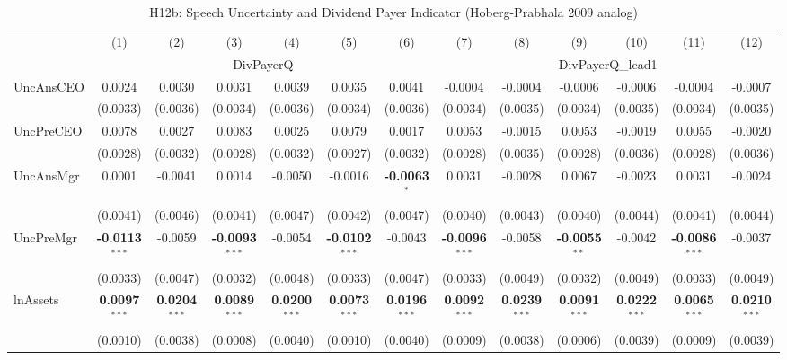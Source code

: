 \begin{landscape}
\begin{table}[H]
\setlength{\tabcolsep}{3pt}
\renewcommand{\arraystretch}{0.85}
\centering
\caption{H12b: Speech Uncertainty and Dividend Payer Indicator (Hoberg-Prabhala 2009 analog)}
\label{tab:h12b}
\scriptsize
\begin{tabular}{lcccccccccccc}
\toprule
 & (1) & (2) & (3) & (4) & (5) & (6) & (7) & (8) & (9) & (10) & (11) & (12) \\
 & \multicolumn{6}{c}{DivPayerQ} & \multicolumn{6}{c}{DivPayerQ\_lead1} \\
\cmidrule(lr){2-7} \cmidrule(lr){8-13}
\midrule
UncAnsCEO & 0.0024 & 0.0030 & 0.0031 & 0.0039 & 0.0035 & 0.0041 & -0.0004 & -0.0004 & -0.0006 & -0.0006 & -0.0004 & -0.0007 \\
 & (0.0033) & (0.0036) & (0.0034) & (0.0036) & (0.0034) & (0.0036) & (0.0034) & (0.0035) & (0.0034) & (0.0035) & (0.0034) & (0.0035) \\
UncPreCEO & 0.0078 & 0.0027 & 0.0083 & 0.0025 & 0.0079 & 0.0017 & 0.0053 & -0.0015 & 0.0053 & -0.0019 & 0.0055 & -0.0020 \\
 & (0.0028) & (0.0032) & (0.0028) & (0.0032) & (0.0027) & (0.0032) & (0.0028) & (0.0035) & (0.0028) & (0.0036) & (0.0028) & (0.0036) \\
UncAnsMgr & 0.0001 & -0.0041 & 0.0014 & -0.0050 & -0.0016 & \textbf{-0.0063}$^{*}$ & 0.0031 & -0.0028 & 0.0067 & -0.0023 & 0.0031 & -0.0024 \\
 & (0.0041) & (0.0046) & (0.0041) & (0.0047) & (0.0042) & (0.0047) & (0.0040) & (0.0043) & (0.0040) & (0.0044) & (0.0041) & (0.0044) \\
UncPreMgr & \textbf{-0.0113}$^{***}$ & -0.0059 & \textbf{-0.0093}$^{***}$ & -0.0054 & \textbf{-0.0102}$^{***}$ & -0.0043 & \textbf{-0.0096}$^{***}$ & -0.0058 & \textbf{-0.0055}$^{**}$ & -0.0042 & \textbf{-0.0086}$^{***}$ & -0.0037 \\
 & (0.0033) & (0.0047) & (0.0032) & (0.0048) & (0.0033) & (0.0047) & (0.0033) & (0.0049) & (0.0032) & (0.0049) & (0.0033) & (0.0049) \\
\midrule
lnAssets & \textbf{0.0097}$^{***}$ & \textbf{0.0204}$^{***}$ & \textbf{0.0089}$^{***}$ & \textbf{0.0200}$^{***}$ & \textbf{0.0073}$^{***}$ & \textbf{0.0196}$^{***}$ & \textbf{0.0092}$^{***}$ & \textbf{0.0239}$^{***}$ & \textbf{0.0091}$^{***}$ & \textbf{0.0222}$^{***}$ & \textbf{0.0065}$^{***}$ & \textbf{0.0210}$^{***}$ \\
 & (0.0010) & (0.0038) & (0.0008) & (0.0040) & (0.0010) & (0.0040) & (0.0009) & (0.0038) & (0.0006) & (0.0039) & (0.0009) & (0.0039) \\

\end{tabular}
\end{table}
\end{landscape}
